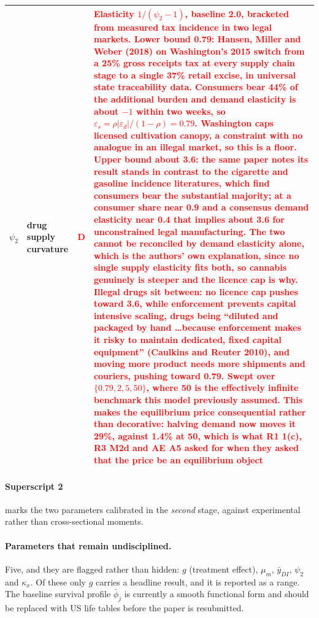 \documentclass[11pt]{article}
\newcommand{\nw}[1]{\textcolor{red}{#1}}
\begin{document}
\begin{longtable}{lL{3.8cm}cL{5.8cm}}
$\psi_2$ & drug supply curvature & \nw{D} & \nw{Elasticity $1/(\psi_2-1)$, \textbf{baseline 2.0}, bracketed from measured tax incidence in two legal markets. \textbf{Lower bound 0.79}: Hansen, Miller and Weber (2018) on Washington's 2015 switch from a 25\% gross receipts tax at every supply chain stage to a single 37\% retail excise, in universal state traceability data. Consumers bear 44\% of the additional burden and demand elasticity is about $-1$ within two weeks, so $\varepsilon_s=\rho|\varepsilon_d|/(1-\rho)=0.79$. Washington caps licensed cultivation canopy, a constraint with no analogue in an illegal market, so this is a floor. \textbf{Upper bound about 3.6}: the same paper notes its result stands in contrast to the cigarette and gasoline incidence literatures, which find consumers bear the substantial majority; at a consumer share near 0.9 and a consensus demand elasticity near 0.4 that implies about 3.6 for unconstrained legal manufacturing. The two cannot be reconciled by demand elasticity alone, which is the authors' own explanation, since no single supply elasticity fits both, so cannabis genuinely is steeper and the licence cap is why. \textbf{Illegal drugs sit between}: no licence cap pushes toward 3.6, while enforcement prevents capital intensive scaling, drugs being ``diluted and packaged by hand \dots because enforcement makes it risky to maintain dedicated, fixed capital equipment'' (Caulkins and Reuter 2010), and moving more product needs more shipments and couriers, pushing toward 0.79. Swept over $\{0.79,2,5,50\}$, where 50 is the effectively infinite benchmark this model previously assumed. \textbf{This makes the equilibrium price consequential rather than decorative}: halving demand now moves it 29\%, against 1.4\% at 50, which is what R1 1(c), R3 M2d and AE A5 asked for when they asked that the price be an equilibrium object}\\
\bottomrule
\end{longtable}

\paragraph{Superscript 2} marks the two parameters calibrated in the
\emph{second} stage, against experimental rather than cross-sectional moments.

\paragraph{Parameters that remain undisciplined.} Five, and they are flagged
rather than hidden: $g$ (treatment effect), $\mu_m$, $\bar y_{DI}$, $\psi_2$ and
$\kappa_x$. Of these only $g$ carries a headline result, and it is reported as a
range. The baseline survival profile $\bar\phi_j$ is currently a smooth
functional form and should be replaced with US life tables before the paper is
resubmitted.
\end{document}
